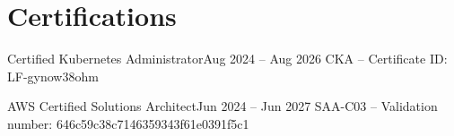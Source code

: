 \section{Certifications}
\resumeSubHeadingListStart

    \resumeSubheading
    {Certified Kubernetes Administrator}{Aug 2024 -- Aug 2026}
    {CKA -- Certificate ID: LF-gynow38ohm}{}


    \resumeSubheading
    {AWS Certified Solutions Architect}{Jun 2024 -- Jun 2027}
    {SAA-C03 -- Validation number: 646c59c38c7146359343f61e0391f5c1}{}


\resumeSubHeadingListEnd
